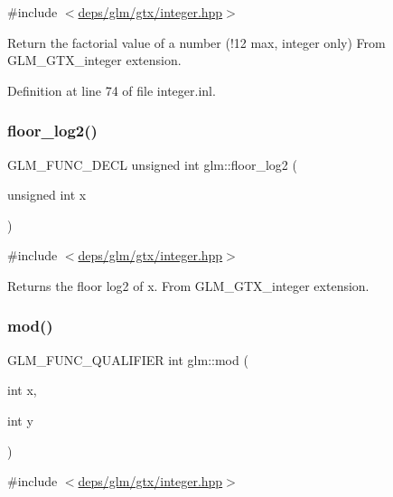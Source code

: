 {\ttfamily \#include $<$\hyperlink{gtx_2integer_8hpp}{deps/glm/gtx/integer.\+hpp}$>$}

Return the factorial value of a number (!12 max, integer only) From G\+L\+M\+\_\+\+G\+T\+X\+\_\+integer extension. 

Definition at line 74 of file integer.\+inl.

\mbox{\label{group__gtx__integer_ga7011b4e1c1e1ed492149b028feacc00e}} 
\subsubsection{\texorpdfstring{floor\+\_\+log2()}{floor\_log2()}}
{\footnotesize\ttfamily G\+L\+M\+\_\+\+F\+U\+N\+C\+\_\+\+D\+E\+CL unsigned int glm\+::floor\+\_\+log2 (\begin{DoxyParamCaption}\item[{unsigned int}]{x }\end{DoxyParamCaption})}



{\ttfamily \#include $<$\hyperlink{gtx_2integer_8hpp}{deps/glm/gtx/integer.\+hpp}$>$}

Returns the floor log2 of x. From G\+L\+M\+\_\+\+G\+T\+X\+\_\+integer extension. \mbox{\label{group__gtx__integer_gab9d22df91aac4d9eb925a4910f556f1b}} 
\subsubsection{\texorpdfstring{mod()}{mod()}\hspace{0.1cm}{\footnotesize\ttfamily [1/2]}}
{\footnotesize\ttfamily G\+L\+M\+\_\+\+F\+U\+N\+C\+\_\+\+Q\+U\+A\+L\+I\+F\+I\+ER int glm\+::mod (\begin{DoxyParamCaption}\item[{int}]{x,  }\item[{int}]{y }\end{DoxyParamCaption})}



{\ttfamily \#include $<$\hyperlink{gtx_2integer_8hpp}{deps/glm/gtx/integer.\+hpp}$>$}

